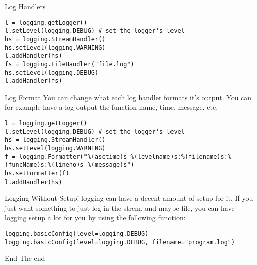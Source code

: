 \begin{frame}[containsverbatim]{Log Handlers}
  \begin{verbatim}
l = logging.getLogger()
l.setLevel(logging.DEBUG) # set the logger's level
hs = logging.StreamHandler()
hs.setLevel(logging.WARNING)
l.addHandler(hs)
fs = logging.FileHandler("file.log")
hs.setLevel(logging.DEBUG)
l.addHandler(fs)
  \end{verbatim}
\end{frame}

\begin{frame}[containsverbatim]{Log Format}
  You can change what each log handler formats it's output. You can for example have a log output the function name, time, message, etc.
    \begin{verbatim}
l = logging.getLogger()
l.setLevel(logging.DEBUG) # set the logger's level
hs = logging.StreamHandler()
hs.setLevel(logging.WARNING)
f = logging.Formatter("%(asctime)s %(levelname)s:%(filename)s:%(funcName)s:%(lineno)s %(message)s")
hs.setFormatter(f)
l.addHandler(hs)
  \end{verbatim}
\end{frame}

\begin{frame}[containsverbatim]{Logging Without Setup!}
  logging can have a decent amount of setup for it. If you just want something to just log in the strem, and maybe file, you can have logging setup a lot for you by using the following function:
  \begin{verbatim}
logging.basicConfig(level=logging.DEBUG)
logging.basicConfig(level=logging.DEBUG, filename="program.log")
\end{verbatim}
\end{frame}

\begin{frame}[standout]{End}
  The end
\end{frame}


